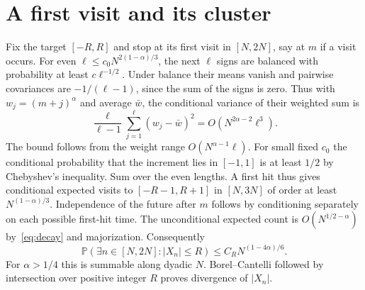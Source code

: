 \documentclass[a4paper,11pt]{amsart}
\newcommand{\PP}{\mathbb P}
\begin{document}
\section{A first visit and its cluster}
Fix the target $[-R,R]$ and stop at its first visit in $[N,2N]$, say at $m$ if a visit occurs. For even $\ell\le c_0 N^{2(1-\alpha)/3}$, the next $\ell$ signs are balanced with probability at least $c\ell^{-1/2}$. Under balance their means vanish and pairwise covariances are $-1/(\ell-1)$, since the sum of the signs is zero. Thus with $w_j=(m+j)^\alpha$ and average $\bar w$, the conditional variance of their weighted sum is
\[
 \frac{\ell}{\ell-1}\sum_{j=1}^{\ell}(w_j-\bar w)^2
 =O(N^{2\alpha-2}\ell^3).
\]
The bound follows from the weight range $O(N^{\alpha-1}\ell)$. For small fixed $c_0$ the conditional probability that the increment lies in $[-1,1]$ is at least $1/2$ by Chebyshev's inequality. Sum over the even lengths. A first hit thus gives conditional expected visits to $[-R-1,R+1]$ in $[N,3N]$ of order at least $N^{(1-\alpha)/3}$. Independence of the future after $m$ follows by conditioning separately on each possible first-hit time. The unconditional expected count is $O(N^{1/2-\alpha})$ by~\eqref{eq:decay} and majorization. Consequently
\[
 \PP(\exists n\in[N,2N]: |X_n|\le R)
 \le C_R N^{(1-4\alpha)/6}.
\]
For $\alpha>1/4$ this is summable along dyadic $N$. Borel--Cantelli followed by intersection over positive integer $R$ proves divergence of $|X_n|$.


\end{document}
